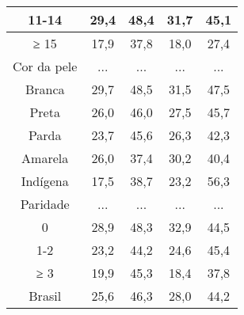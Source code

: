 \documentclass{article}
\begin{document}
\begin{table}
\begin{tabulary}{\linewidth}{ C C C C C }
11-14
& 29,4
& 48,4
& 31,7
& 45,1
\\ \hline

≥ 15
& 17,9
& 37,8
& 18,0
& 27,4
\\ \hline

Cor da pele
& ...
& ...
& ...
& ...
\\ \hline

Branca
& 29,7
& 48,5
& 31,5
& 47,5
\\ \hline

Preta
& 26,0
& 46,0
& 27,5
& 45,7
\\ \hline

Parda
& 23,7
& 45,6
& 26,3
& 42,3
\\ \hline

Amarela
& 26,0
& 37,4
& 30,2
& 40,4
\\ \hline

Indígena
& 17,5
& 38,7
& 23,2
& 56,3
\\ \hline

Paridade
& ...
& ...
& ...
& ...
\\ \hline

0
& 28,9
& 48,3
& 32,9
& 44,5
\\ \hline

1-2
& 23,2
& 44,2
& 24,6
& 45,4
\\ \hline

≥ 3
& 19,9
& 45,3
& 18,4
& 37,8
\\ \hline

Brasil
& 25,6
& 46,3
& 28,0
& 44,2
\\ \hline

\end{tabulary}
\caption*{\footnotesize }
\caption{}
\end{table}
\end{document}
